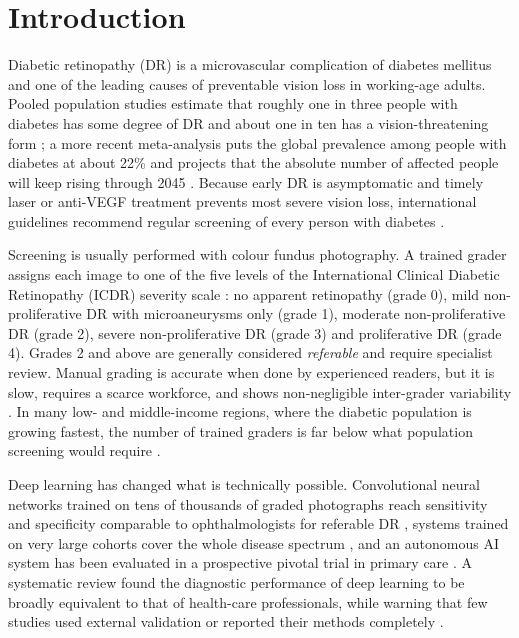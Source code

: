 \section{Introduction}\label{sec:intro}
Diabetic retinopathy (DR) is a microvascular complication of diabetes mellitus and one of the leading causes of
preventable vision loss in working-age adults. Pooled population studies estimate that roughly one in three people
with diabetes has some degree of DR and about one in ten has a vision-threatening form \citep{yau2012global}; a more
recent meta-analysis puts the global prevalence among people with diabetes at about 22\% and projects that the
absolute number of affected people will keep rising through 2045 \citep{teo2021global}. Because early DR is
asymptomatic and timely laser or anti-VEGF treatment prevents most severe vision loss, international guidelines
recommend regular screening of every person with diabetes \citep{ting2016diabetic}.

Screening is usually performed with colour fundus photography. A trained grader assigns each image to one of the five
levels of the International Clinical Diabetic Retinopathy (ICDR) severity scale \citep{wilkinson2003proposed}:
no apparent retinopathy (grade 0), mild non-proliferative DR with microaneurysms only (grade 1), moderate
non-proliferative DR (grade 2), severe non-proliferative DR (grade 3) and proliferative DR (grade 4). Grades 2 and
above are generally considered \emph{referable} and require specialist review. Manual grading is accurate when done by
experienced readers, but it is slow, requires a scarce workforce, and shows non-negligible inter-grader variability
\citep{krause2018grader}. In many low- and middle-income regions, where the diabetic population is growing fastest,
the number of trained graders is far below what population screening would require \citep{ting2016diabetic}.

Deep learning has changed what is technically possible. Convolutional neural networks trained on tens of thousands
of graded photographs reach sensitivity and specificity comparable to ophthalmologists for referable DR
\citep{gulshan2016development,gargeya2017automated,ting2017development}, systems trained on very large cohorts cover
the whole disease spectrum \citep{dai2021deep}, and an autonomous AI system has been evaluated in a prospective
pivotal trial in primary care \citep{abramoff2018pivotal}. A systematic review found the diagnostic performance of
deep learning to be broadly equivalent to that of health-care professionals, while warning that few studies used
external validation or reported their methods completely \citep{liu2019comparison}.

